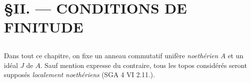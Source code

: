 \chapter*{\S \space II. --- CONDITIONS DE FINITUDE}\thispagestyle{empty}
\label{ch:2}
\section*{}

Dans tout ce chapitre, on fixe un anneau commutatif unifère \emph{noethérien} $A$ et un idéal $J$ de $A$. 
Sauf mention expresse du contraire, tous les topos considérés seront supposés \emph{localement noethériens} 
(SGA 4 VI 2.11.).

